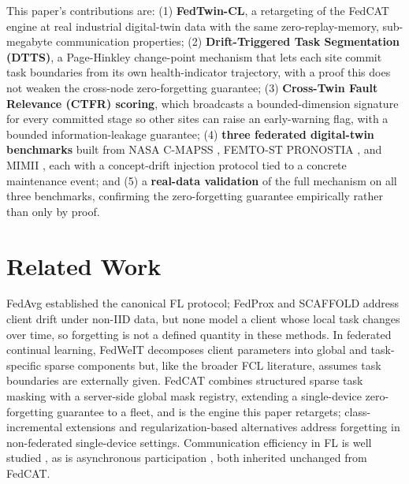 \documentclass[journal]{IEEEtran}
\begin{document}
This paper's contributions are: (1) \textbf{FedTwin-CL}, a retargeting of the FedCAT engine at real industrial digital-twin data with the same zero-replay-memory, sub-megabyte communication properties; (2) \textbf{Drift-Triggered Task Segmentation (DTTS)}, a Page-Hinkley change-point mechanism \cite{page1954} that lets each site commit task boundaries from its own health-indicator trajectory, with a proof this does not weaken the cross-node zero-forgetting guarantee; (3) \textbf{Cross-Twin Fault Relevance (CTFR) scoring}, which broadcasts a bounded-dimension signature for every committed stage so other sites can raise an early-warning flag, with a bounded information-leakage guarantee; (4) \textbf{three federated digital-twin benchmarks} built from NASA C-MAPSS \cite{saxena2008cmapss}, FEMTO-ST PRONOSTIA \cite{nectoux2012pronostia}, and MIMII \cite{purohit2019mimii}, each with a concept-drift injection protocol tied to a concrete maintenance event; and (5) a \textbf{real-data validation} of the full mechanism on all three benchmarks, confirming the zero-forgetting guarantee empirically rather than only by proof.

\section{Related Work}

FedAvg \cite{mcmahan2017fedavg} established the canonical FL protocol; FedProx \cite{li2020fedprox} and SCAFFOLD \cite{karimireddy2020scaffold} address client drift under non-IID data, but none model a client whose local task changes over time, so forgetting is not a defined quantity in these methods. In federated continual learning, FedWeIT \cite{yoon2021fedweit} decomposes client parameters into global and task-specific sparse components but, like the broader FCL literature, assumes task boundaries are externally given. FedCAT \cite{fedcat2026} combines structured sparse task masking with a server-side global mask registry, extending a single-device zero-forgetting guarantee to a fleet, and is the engine this paper retargets; class-incremental extensions \cite{mallya2018packnet} and regularization-based alternatives \cite{kirkpatrick2017ewc} address forgetting in non-federated single-device settings. Communication efficiency in FL is well studied \cite{alistarh2017qsgd,lin2018deepcompress,diao2021heterofl,horvath2021fjord}, as is asynchronous participation \cite{xie2019asyncfed}, both inherited unchanged from FedCAT.
\end{document}
